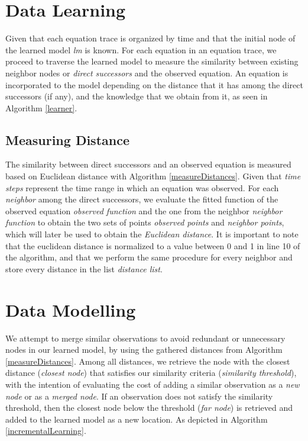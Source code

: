 \section{Data Learning}
Given that each equation trace is organized by time and that the initial node of the learned model \textit{lm} is known.
%
For each equation in an equation trace, we proceed to traverse the learned model to measure the similarity between existing neighbor nodes or \textit{direct successors} and the observed equation. 
%
An equation is incorporated to the model depending on the distance that it has among the direct successors (if any), and the knowledge that we obtain from it, as seen in Algorithm \ref{learner}.
%

%
\subsection{Measuring Distance}
The similarity between direct successors and an observed equation is measured based on Euclidean distance with Algorithm \ref{measureDistances}. Given that \textit{time steps} represent the time range in which an equation was observed. For each \textit{neighbor} among the direct successors, we evaluate the fitted function of the observed equation \textit{observed function} and the one from the neighbor \textit{neighbor function} to obtain the two sets of points \textit{observed points} and \textit{neighbor points}, which will later be used to obtain the \textit{Euclidean distance}. It is important to note that the euclidean distance is normalized to a value between 0 and 1 in line 10 of the algorithm, and that we perform the same procedure for every neighbor and store every distance in the list \textit{distance list}. 
%


\section{Data Modelling}
We attempt to merge similar observations to avoid redundant or unnecessary nodes in our learned model, by using the gathered distances from Algorithm \ref{measureDistances}. 
%
Among all distances, we retrieve the node with the closest distance (\textit{closest node}) that satisfies our similarity criteria (\textit{similarity threshold}), with the intention of evaluating the cost of adding a similar observation as a \textit{new node} or as a \textit{merged node}. If an observation does not satisfy the similarity threshold, then the closest node below the threshold (\textit{far node}) is retrieved and added to the learned model as a new location. As depicted in Algorithm \ref{incrementalLearning}.
%

%
